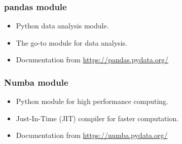 
\begin{frame}[fragile]
\frametitle{pandas module}

\begin{itemize}
\item Python data analysis module.
\item The go-to module for data analysis.
\item Documentation from \url{https://pandas.pydata.org/}
\end{itemize}

%

\end{frame}


\begin{frame}[fragile]
\frametitle{Numba module}

\begin{itemize}
\item Python module for high performance computing.
\item Just-In-Time (JIT) compiler for faster computation.
\item Documentation from \url{https://numba.pydata.org/}
\end{itemize}

%

\end{frame}

